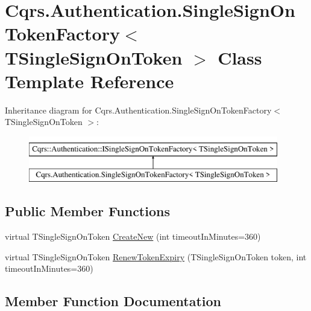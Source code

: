 \hypertarget{classCqrs_1_1Authentication_1_1SingleSignOnTokenFactory}{}\section{Cqrs.\+Authentication.\+Single\+Sign\+On\+Token\+Factory$<$ T\+Single\+Sign\+On\+Token $>$ Class Template Reference}
\label{classCqrs_1_1Authentication_1_1SingleSignOnTokenFactory}
Inheritance diagram for Cqrs.\+Authentication.\+Single\+Sign\+On\+Token\+Factory$<$ T\+Single\+Sign\+On\+Token $>$\+:\begin{figure}[H]
\begin{center}
\leavevmode
\includegraphics[height=2.000000cm]{classCqrs_1_1Authentication_1_1SingleSignOnTokenFactory}
\end{center}
\end{figure}
\subsection*{Public Member Functions}
\begin{DoxyCompactItemize}
\item 
virtual T\+Single\+Sign\+On\+Token \hyperlink{classCqrs_1_1Authentication_1_1SingleSignOnTokenFactory_ab4d01a3600dbe9aa358cd93c98ccf281_ab4d01a3600dbe9aa358cd93c98ccf281}{Create\+New} (int timeout\+In\+Minutes=360)
\item 
virtual T\+Single\+Sign\+On\+Token \hyperlink{classCqrs_1_1Authentication_1_1SingleSignOnTokenFactory_a699ceac65874b8319d2e26fa88f554be_a699ceac65874b8319d2e26fa88f554be}{Renew\+Token\+Expiry} (T\+Single\+Sign\+On\+Token token, int timeout\+In\+Minutes=360)
\end{DoxyCompactItemize}


\subsection{Member Function Documentation}
\mbox{\label{classCqrs_1_1Authentication_1_1SingleSignOnTokenFactory_ab4d01a3600dbe9aa358cd93c98ccf281_ab4d01a3600dbe9aa358cd93c98ccf281}} 
